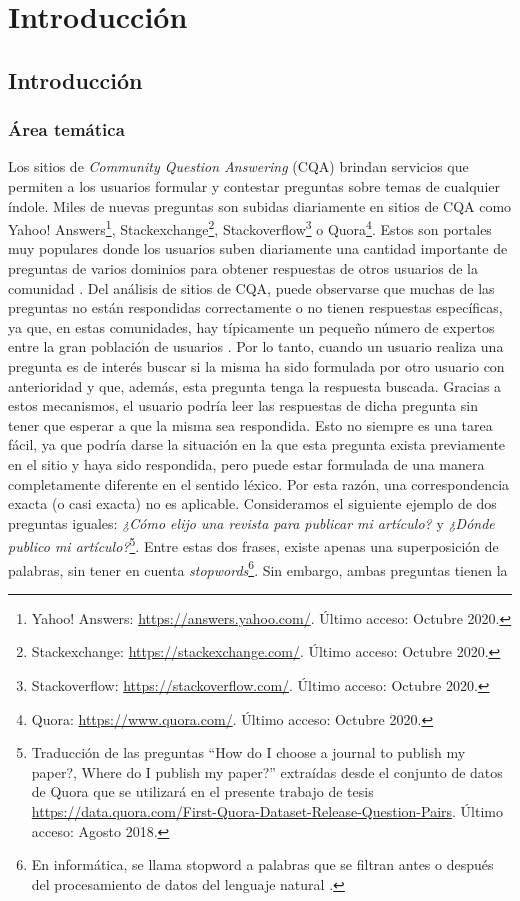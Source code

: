 \chapter*{Introducción}\label{ch:introduccion}

\section{Introducción}

\subsection{Área temática}
Los sitios de \textit{Community Question Answering} (CQA) brindan servicios que permiten a los usuarios formular y contestar preguntas sobre temas de cualquier índole. Miles de nuevas preguntas son subidas diariamente en sitios de CQA como Yahoo! Answers\footnote{Yahoo! Answers: \url{https://answers.yahoo.com/}. Último acceso: Octubre 2020.}, Stackexchange\footnote{Stackexchange: \url{https://stackexchange.com/}. Último acceso: Octubre 2020.}, Stackoverflow\footnote{Stackoverflow: \url{https://stackoverflow.com/}. Último acceso: Octubre 2020.} o Quora\footnote{Quora: \url{https://www.quora.com/}. Último acceso: Octubre 2020.}. Estos son portales muy populares donde los usuarios suben diariamente una cantidad importante de preguntas de varios dominios para obtener respuestas de otros usuarios de la comunidad \citep{anuyah2017can}. Del análisis de sitios de CQA, puede observarse que muchas de las preguntas no están respondidas correctamente o no tienen respuestas específicas, ya que, en estas comunidades, hay típicamente un pequeño número de expertos entre la gran población de usuarios \citep{yang2013cqarank}. Por lo tanto, cuando un usuario realiza una pregunta es de interés buscar si la misma ha sido formulada por otro usuario con anterioridad y que, además, esta pregunta tenga la respuesta buscada. Gracias a estos mecanismos, el usuario podría leer las respuestas de dicha pregunta sin tener que esperar a que la misma sea respondida. Esto no siempre es una tarea fácil, ya que podría darse la situación en la que esta pregunta exista previamente en el sitio y haya sido respondida, pero puede estar formulada de una manera completamente diferente en el sentido léxico. Por esta razón, una correspondencia exacta (o casi exacta) no es aplicable. Consideramos el siguiente ejemplo de dos preguntas iguales: \textit{¿Cómo elijo una revista para publicar mi artículo?} y \textit{¿Dónde publico mi artículo?}\footnote{Traducción de las preguntas “How do I choose a journal to publish my paper?, Where do I publish my paper?” extraídas desde el conjunto de datos de Quora que se utilizará en el presente trabajo de tesis \url{https://data.quora.com/First-Quora-Dataset-Release-Question-Pairs}. Último acceso: Agosto 2018.}. Entre estas dos frases, existe apenas una superposición de palabras, sin tener en cuenta \textit{stopwords}\footnote{En informática, se llama stopword a palabras que se filtran antes o después del procesamiento de datos del lenguaje natural \citep{leskovec2014mining}.}. Sin embargo, ambas preguntas tienen la 